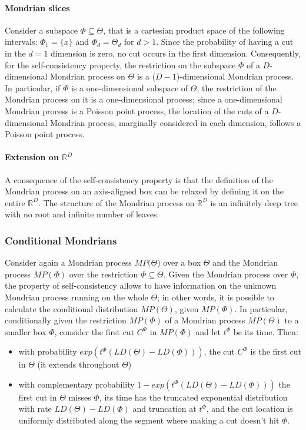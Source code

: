\documentclass[a4paper]{article}
\begin{document}
\paragraph{Mondrian slices}
Consider a subspace $\Phi \subseteq \Theta$, that is a cartesian product space of the following intervals: $\Phi_1 = \{x\}$ and $\Phi_d = \Theta_d$ for $d>1$.
Since the probability of having a cut in the $d=1$ dimension is zero, no cut occurs in the first dimension.
Consequently, for the self-consistency property, the restriction on the subspace $\Phi$ of a $D$-dimensional Mondrian process on $\Theta$ is a ($D-1$)-dimensional Mondrian process.
In particular, if $\Phi$ is a one-dimensional subspace of $\Theta$, the restriction of the Mondrian process on it is a one-dimensional process;
since a one-dimensional Mondrian process is a Poisson point process, the location of the cuts of a $D$-dimensional Mondrian process, marginally considered in each dimension, follows a Poisson point process.

\paragraph{Extension on $\mathbb{R}^D$}
A consequence of the self-consistency property is that the definition of the Mondrian process on an axis-aligned box can be relaxed by defining it on the entire $\mathbb{R}^D$.
The structure of the Mondrian process on $\mathbb{R}^D$ is an infinitely deep tree with no root and infinite number of leaves.


\subsubsection*{Conditional Mondrians}
Consider again a Mondrian process $MP(\Theta$) over a box $\Theta$ and the Mondrian process $MP(\Phi)$ over the restriction $\Phi \subseteq \Theta$. 
Given the Mondrian process over $\Phi$, the property of self-consistency allows to have information on the unknown Mondrian process running on the whole $\Theta$;
in other words, it is possible to calculate the conditional distribution $MP(\Theta)$, given $MP(\Phi)$.
In particular, conditionally given the restriction $MP(\Phi)$ of a Mondrian process $MP(\Theta)$ to a smaller box $\Phi$, consider the first cut $C^{\Phi}$ in $MP(\Phi)$ and let $t^{\Phi}$ be its time. Then:
\begin{itemize}[nolistsep]
\item with probability $exp(t^{\Phi}(LD(\Theta)-LD(\Phi)))$, the cut $C^{\Phi}$ is the first cut in $\Theta$ (it extends throughout $\Theta$)
\item with complementary probability $1-exp(t^{\Phi}(LD(\Theta)-LD(\Phi)))$ the first cut in $\Theta$ misses $\Phi$, its time has the truncated exponential distribution with rate $LD(\Theta)-LD(\Phi)$ and truncation at $t^{\Phi}$, and the cut location is uniformly distributed along the segment where making a cut doesn't hit $\Phi$.
\end{itemize}
\end{document}
